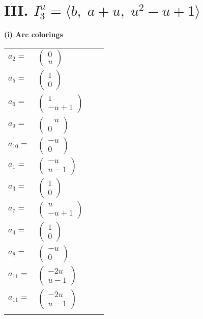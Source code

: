 \documentclass[1p]{elsarticle_modified}
\theoremstyle{definition}
\begin{document}
\centering \section*{III. $I^u_{3}= \langle b,\;a+u,\;u^2- u+1 \rangle$}
\flushleft \textbf{(i) Arc colorings}\\
\begin{tabular}{m{7pt} m{180pt} m{7pt} m{180pt} }
\flushright $a_{2}=$&$\begin{pmatrix}0\\u\end{pmatrix}$ \\
\flushright $a_{5}=$&$\begin{pmatrix}1\\0\end{pmatrix}$ \\
\flushright $a_{6}=$&$\begin{pmatrix}1\\- u+1\end{pmatrix}$ \\
\flushright $a_{9}=$&$\begin{pmatrix}- u\\0\end{pmatrix}$ \\
\flushright $a_{10}=$&$\begin{pmatrix}- u\\0\end{pmatrix}$ \\
\flushright $a_{1}=$&$\begin{pmatrix}- u\\u-1\end{pmatrix}$ \\
\flushright $a_{3}=$&$\begin{pmatrix}1\\0\end{pmatrix}$ \\
\flushright $a_{7}=$&$\begin{pmatrix}u\\- u+1\end{pmatrix}$ \\
\flushright $a_{4}=$&$\begin{pmatrix}1\\0\end{pmatrix}$ \\
\flushright $a_{8}=$&$\begin{pmatrix}- u\\0\end{pmatrix}$ \\
\flushright $a_{11}=$&$\begin{pmatrix}-2 u\\u-1\end{pmatrix}$\\ \flushright $a_{11}=$&$\begin{pmatrix}-2 u\\u-1\end{pmatrix}$\\&\end{tabular}
\end{document}

